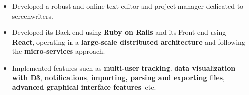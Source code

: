 \documentclass[10pt,a4paper,ragged2e]{altacv}
\begin{document}

\begin{fullwidth}
\makecvheader%
\end{fullwidth}



\begin{itemize}
\item Developed a robust and online text editor and project manager dedicated to screenwriters.
\item Developed its Back-end using \textbf{Ruby on Rails} and its Front-end using \textbf{React}, operating in a \textbf{large-scale distributed architecture} and following the \textbf{micro-services} approach.
\item Implemented features such as \textbf{multi-user tracking}, \textbf{data visualization with D3}, \textbf{notifications}, \textbf{importing, parsing and exporting files}, \textbf{advanced graphical interface features}, etc.
\end{itemize}

\divider%

\end{document}
